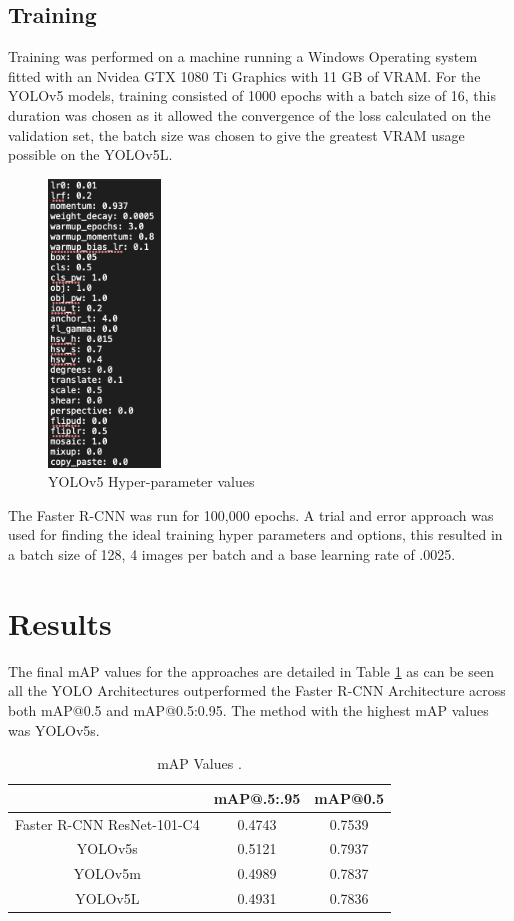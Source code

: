 \documentclass[conference]{IEEEtran}
\begin{document}
\subsection{Training}
Training was performed on a machine running a Windows Operating system fitted with an Nvidea GTX 1080 Ti Graphics with 11 GB of VRAM. For the YOLOv5 models, training consisted of 1000 epochs with a batch size of 16, this duration was chosen as it allowed the convergence of the loss calculated on the validation set, the batch size was chosen to give the greatest VRAM usage possible on the YOLOv5L.

\begin{figure}[H]
    \centering
    \includegraphics[width=3cm]{Images/YoloHyperparameters.png}
    \caption{YOLOv5 Hyper-parameter values}
    \label{fig:hyp}
\end{figure}

The Faster R-CNN was run for 100,000 epochs. A trial and error approach was used for finding the ideal training hyper parameters and options, this resulted in a batch size of 128, 4 images per batch and a base learning rate of .0025.

 
\section{Results}

The final mAP values for the approaches are detailed in Table \ref{tab:Map} as can be seen all the YOLO Architectures outperformed the Faster R-CNN Architecture across both mAP@0.5 and mAP@0.5:0.95. The method with the highest mAP values was YOLOv5s.

\begin{table}[H]
\begin{center}
\begin{tabular}{ |c|c|c| }
\hline
  & mAP@.5:.95 & mAP@0.5  \\ 
 \hline
 Faster R-CNN ResNet-101-C4 & 0.4743 & 0.7539 \\  
 \hline
 YOLOv5s & 0.5121 & 0.7937 \\
 \hline
 YOLOv5m & 0.4989 & 0.7837 \\
 \hline
 YOLOv5L & 0.4931 & 0.7836 \\
 \hline
\end{tabular}
\vspace*{3mm}
\caption{\label{tab:Map}mAP Values
.}
\end{center}
\end{table}
 
\end{document}
